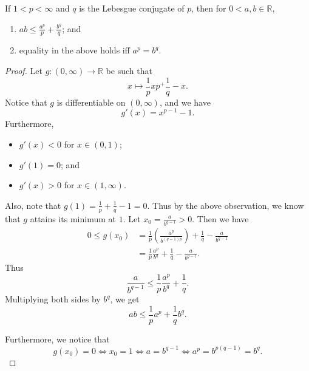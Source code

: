 \documentclass[notoc,notitlepage]{tufte-book}
\begin{document}
\begin{lemma}\label{lemma:young_s_inequality}
  If $1 < p < \infty$ and $q$ is the Lebesgue conjugate of $p$, then for $0 < a,
  b \in \mathbb{R}$,
  \begin{enumerate}
    \item $ab \leq \frac{a^p}{p} + \frac{b^q}{q}$; and
    \item equality in the above holds iff $a^p = b^q$.
  \end{enumerate}
\end{lemma}


\begin{proof}
  Let $g : (0, \infty) \to \mathbb{R}$ be such that
  \begin{equation*}
    x \mapsto \frac{1}{p} xp ^+ \frac{1}{q} - x.
  \end{equation*}
  Notice that $g$ is differentiable on $(0, \infty)$, and we have
  \begin{equation*}
    g'(x) = x^{p-1} - 1.
  \end{equation*}
  Furthermore,
  \begin{itemize}
    \item $g'(x) < 0$ for $x \in (0, 1)$;
    \item $g'(1) = 0$; and
    \item $g'(x) > 0$ for $x \in (1, \infty)$.
  \end{itemize}
  Also, note that $g(1) = \frac{1}{p} + \frac{1}{q} - 1 = 0$. Thus by the above
  observation, we know that $g$ attains its minimum at $1$. Let $x_0 =
  \frac{a}{b^{q-1}} > 0$. Then we have
  \begin{align*}
    0 \leq g(x_0)
    &= \frac{1}{p} \left( \frac{a^p}{b^{(q-1)p}} \right) + \frac{1}{q} -
      \frac{a}{b^{q-1}} \\
    &= \frac{1}{p} \frac{a^p}{b^q} + \frac{1}{q} - \frac{a}{b^{q-1}}.
  \end{align*} 
  Thus
  \begin{equation*}
    \frac{a}{b^{q-1}} \leq \frac{1}{p} \frac{a^p}{b^q} + \frac{1}{q}.
  \end{equation*}
  Multiplying both sides by $b^q$, we get
  \begin{equation*}
    ab \leq \frac{1}{p} a^p + \frac{1}{q} b^q.
  \end{equation*}

  Furthermore, we notice that
  \begin{equation*}
    g(x_0) = 0 \iff x_0 = 1 \iff a = b^{q-1} \iff a^p = b^{p(q-1)} = b^q.
  \end{equation*}
\end{proof}
\end{document}
